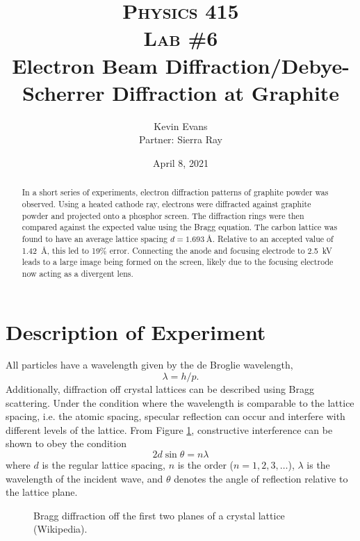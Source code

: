 \documentclass[notitlepage]{report}
\title{
	\textsc{ \small
		Physics 415
	} \\
	{\textsc{\small Lab \#6}} \\
	Electron Beam Diffraction/Debye-Scherrer Diffraction at Graphite
}
\author{Kevin Evans \\ Partner: Sierra Ray}
\date{April 8, 2021}
\begin{document}
	\begin{titlingpage}
		\maketitle
		\begin{abstract}
			\noindent In a short series of experiments, electron diffraction patterns of graphite powder was observed. Using a heated cathode ray, electrons were diffracted against graphite powder and projected onto a phosphor screen. The diffraction rings were then compared against the expected value using the Bragg equation. 
			The carbon lattice was found to have an average lattice spacing $d=\SI{1.693}{\angstrom}$. Relative to an accepted value of \SI{1.42}{\angstrom}, this led to 19\% error. Connecting the anode and focusing electrode to \SI{2.5}{\kV} leads to a large image being formed on the screen, likely due to the focusing electrode now acting as a divergent lens.
		\end{abstract}
	\end{titlingpage}

	\section{Description of Experiment}
	
	All particles have a wavelength given by the de Broglie wavelength, \begin{equation}
		\lambda  = h / p. \label{eq:deBroglie}
	\end{equation}
	Additionally, diffraction off crystal lattices can be described using Bragg scattering. Under the condition where the wavelength is comparable to the lattice spacing, i.e. the atomic spacing, specular reflection can occur and interfere with different levels of the lattice. From Figure \ref{fig:braggplanediffraction}, constructive interference can be shown to obey the condition \begin{equation}
		2d \sin \theta = n \lambda \label{eq:bragg}
	\end{equation}
	where $d$ is the regular lattice spacing, $n$ is the order ($n=1, 2, 3,\dots$), $\lambda$ is the wavelength of the incident wave, and $\theta$ denotes the angle of reflection relative to the lattice plane.

	\begin{figure}[h]
		\centering
		 \def\svgwidth{0.6\linewidth}
		
		\caption{Bragg diffraction off the first two planes of a crystal lattice (Wikipedia).}
		\label{fig:braggplanediffraction}
	\end{figure}
	
\end{document}
